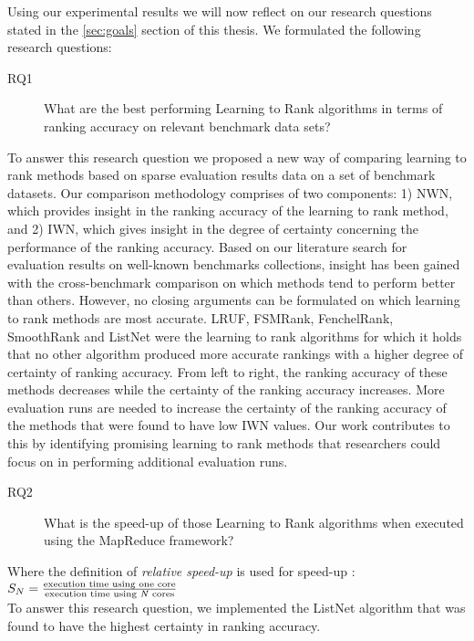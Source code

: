 Using our experimental results we will now reflect on our research questions stated in the \ref{sec:goals} section of this thesis. We formulated the following research questions:
\begin{description}
\item[RQ1] What are the best performing Learning to Rank algorithms in terms of ranking accuracy on relevant benchmark data sets?
\end{description}
To answer this research question we proposed a new way of comparing learning to rank methods based on sparse evaluation results data on a set of benchmark datasets. Our comparison methodology comprises of two components: 1) \ac{NWN}, which provides insight in the ranking accuracy of the learning to rank method, and 2) \ac{IWN}, which gives insight in the degree of certainty concerning the performance of the ranking accuracy. Based on our literature search for evaluation results on well-known benchmarks collections, insight has been gained with the cross-benchmark comparison on which methods tend to perform better than others. However, no closing arguments can be formulated on which learning to rank methods are most accurate. LRUF, FSMRank, FenchelRank, SmoothRank and ListNet were the learning to rank algorithms for which it holds that no other algorithm produced more accurate rankings with a higher degree of certainty of ranking accuracy. From left to right, the ranking accuracy of these methods decreases while the certainty of the ranking accuracy increases. More evaluation runs are needed to increase the certainty of the ranking accuracy of the methods that were found to have low \ac{IWN} values. Our work contributes to this by identifying promising learning to rank methods that researchers could focus on in performing additional evaluation runs.

\begin{description}
\item[RQ2] What is the speed-up of those Learning to Rank algorithms when executed using the MapReduce framework?
\end{description}
\bigskip
Where the definition of \emph{relative speed-up} is used for speed-up \cite{Sun1991}:\\

$S_N = \frac{\text{execution time using one core}}{\text{execution time using \emph{N} cores}}$\\

To answer this research question, we implemented the ListNet algorithm that was found to have the highest certainty in ranking accuracy.\\

